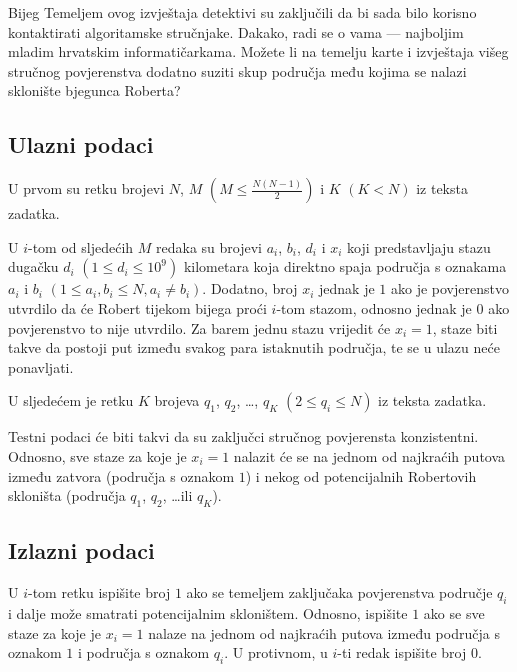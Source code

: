 \begin{statement}[
  problempoints=100,
  timelimit=2 sekunde,
  memorylimit=512 MiB,
]{Bijeg}
Temeljem ovog izvještaja detektivi su zaključili da bi sada bilo korisno
kontaktirati algoritamske stručnjake. Dakako, radi se o vama --- najboljim
mladim hrvatskim informatičarkama. Možete li na temelju karte i izvještaja višeg
stručnog povjerenstva dodatno suziti skup područja među kojima se nalazi
sklonište bjegunca Roberta?

\subsection*{Ulazni podaci}

U prvom su retku brojevi $N$, $M$ $(M \le \frac{N(N-1)}{2})$ i $K$ $(K < N)$
iz teksta zadatka.

U $i$-tom od sljedećih $M$ redaka su brojevi $a_i$, $b_i$, $d_i$ i $x_i$ koji
predstavljaju stazu dugačku $d_i$ $(1 \le d_i \le 10^9)$ kilometara koja
direktno spaja područja s oznakama $a_i$ i $b_i$ $(1 \le a_i, b_i \le N, a_i
\ne b_i)$. Dodatno, broj $x_i$ jednak je $1$ ako je povjerenstvo utvrdilo da će
Robert tijekom bijega proći $i$-tom stazom, odnosno jednak je $0$ ako
povjerenstvo to nije utvrdilo. Za barem jednu stazu vrijedit će $x_i = 1$,
staze biti takve da postoji put između svakog para istaknutih područja, te se u
ulazu neće ponavljati.

U sljedećem je retku $K$ brojeva $q_1$, $q_2$, \ldots, $q_K$ $(2 \le q_i \le N)$
iz teksta zadatka.

Testni podaci će biti takvi da su zaključci stručnog povjerensta konzistentni.
Odnosno, sve staze za koje je $x_i = 1$ nalazit će se na jednom od najkraćih
putova između zatvora (područja s oznakom $1$) i nekog od potencijalnih
Robertovih skloništa (područja $q_1$, $q_2$, \ldots ili $q_K$).

\clearpage

\subsection*{Izlazni podaci}

U $i$-tom retku ispišite broj $1$ ako se temeljem zaključaka povjerenstva područje
$q_i$ i dalje može smatrati potencijalnim skloništem. Odnosno, ispišite $1$ ako
se sve staze za koje je $x_i = 1$ nalaze na jednom od najkraćih putova između
područja s oznakom $1$ i područja s oznakom $q_i$. U protivnom, u $i$-ti redak
ispišite broj $0$.


\end{statement}
